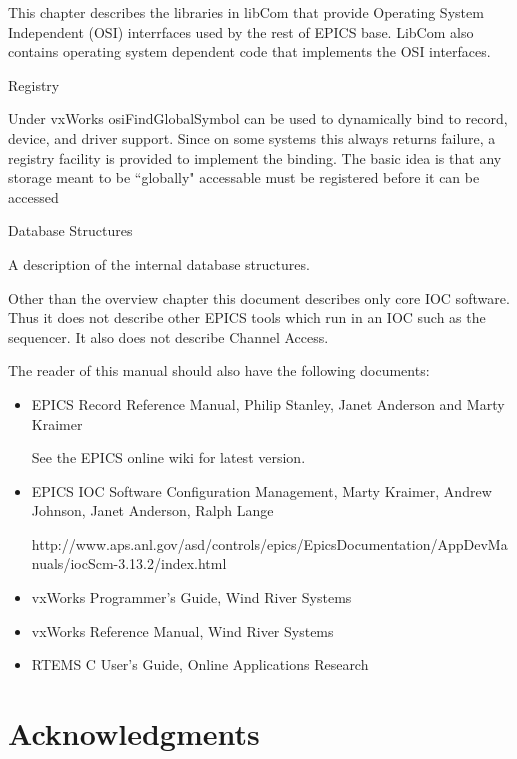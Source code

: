 \begin{description}\item This chapter describes the libraries in libCom that provide Operating System Independent (OSI) interrfaces used 
by the rest of EPICS base. LibCom also contains operating system dependent code that implements the OSI 
interfaces.

\end{description}Registry

\begin{description}\item Under vxWorks osiFindGlobalSymbol can be used to dynamically bind to record, device, and driver support. Since 
on some systems this always returns failure, a registry facility is provided to implement the binding. The basic idea 
is that any storage meant to be ``globally" accessable must be registered before it can be accessed 

\end{description}Database Structures

\begin{description}\item A description of the internal database structures.

\end{description}Other than the overview chapter this document describes only core IOC software. Thus it does not describe other EPICS 
tools which run in an IOC such as the sequencer. It also does not describe Channel Access. 

The reader of this manual should also have the following documents:

\begin{itemize}\item EPICS Record Reference Manual, Philip Stanley, Janet Anderson and Marty Kraimer

See the EPICS online wiki for latest version.

\item EPICS IOC Software Configuration Management, Marty Kraimer, Andrew Johnson, Janet Anderson, Ralph Lange 

http://www.aps.anl.gov/asd/controls/epics/EpicsDocumentation/AppDevManuals/iocScm-3.13.2/index.html

\item vxWorks Programmer's Guide, Wind River Systems

\item vxWorks Reference Manual, Wind River Systems

\item RTEMS C User's Guide, Online Applications Research 

\end{itemize}\section{Acknowledgments}

